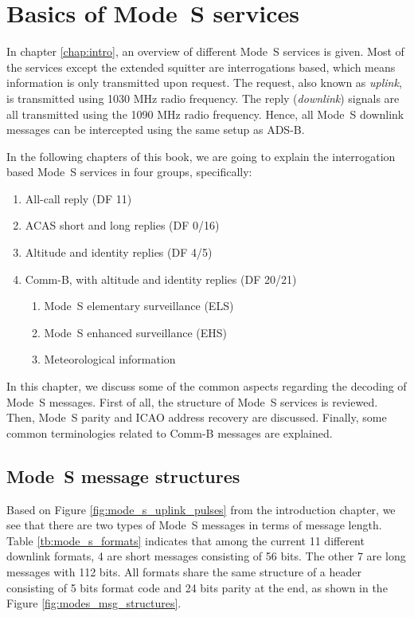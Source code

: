 \chapter{Basics of Mode~S services} \label{chap:mode_s_basics}

In chapter \ref{chap:intro}, an overview of different Mode~S services is given. Most of the services except the extended squitter are interrogations based, which means information is only transmitted upon request. The request, also known as \emph{uplink}, is transmitted using 1030 MHz radio frequency. The reply (\emph{downlink}) signals are all transmitted using the 1090 MHz radio frequency. Hence, all Mode~S downlink messages can be intercepted using the same setup as ADS-B.

In the following chapters of this book, we are going to explain the interrogation based Mode~S services in four groups, specifically:

\begin{enumerate}
  \item All-call reply (DF 11)
  \item ACAS short and long replies (DF 0/16)
  \item Altitude and identity replies (DF 4/5)
  \item Comm-B, with altitude and identity replies (DF 20/21)
    \begin{enumerate}
      \item Mode~S elementary surveillance (ELS)
      \item Mode~S enhanced surveillance (EHS)
      \item Meteorological information
    \end{enumerate}
\end{enumerate}

In this chapter, we discuss some of the common aspects regarding the decoding of Mode~S messages. First of all, the structure of Mode~S services is reviewed. Then, Mode~S parity and ICAO address recovery are discussed. Finally, some common terminologies related to Comm-B messages are explained.


\section{Mode~S message structures}

Based on Figure \ref{fig:mode_s_uplink_pulses} from the introduction chapter, we see that there are two types of Mode~S messages in terms of message length. Table \ref{tb:mode_s_formats} indicates that among the current 11 different downlink formats, 4 are short messages consisting of 56 bits. The other 7 are long messages with 112 bits. All formats share the same structure of a header consisting of 5 bits format code and 24 bits parity at the end, as shown in the Figure \ref{fig:modes_msg_structures}.

